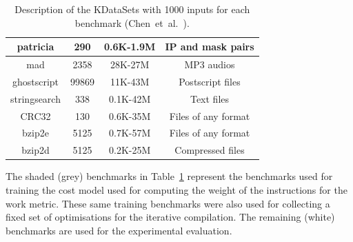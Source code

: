 \documentclass[sigplan,10pt]{acmart}
\theoremstyle{definition}
\newcommand{\etal}{et~al.}
\newcommand{\itercomp}{{iterative compilation}}
\begin{document}
\begin{table}[h]
{\begin{tabular}{|c|c|c|c|}
\rowcolor{gray!20}
patricia      & 290    & 0.6K-1.9M                  & IP and mask pairs              \\ \hline
\rowcolor{gray!20}
mad           & 2358   & 28K-27M                    & MP3 audios                     \\ \hline
\rowcolor{gray!20}
ghostscript   & 99869  & 11K-43M                    & Postscript files               \\ \hline
\rowcolor{gray!20}
stringsearch  & 338    &  0.1K-42M                 &  Text files                     \\ \hline
\rowcolor{gray!20}
CRC32         & 130    & 0.6K-35M                   & Files of any format            \\ \hline
\rowcolor{gray!20}
bzip2e        & 5125   & 0.7K-57M                   & Files of any format            \\ \hline
\rowcolor{gray!20}
bzip2d        & 5125   & 0.2K-25M                   & Compressed files               \\ \hline
\end{tabular}
}
\caption{Description of the KDataSets with 1000 inputs for each benchmark (Chen~\etal~\cite{chen10,chen12a}).}
\label{tab:kdatasets}
\end{table}

The shaded (grey) benchmarks in Table~\ref{tab:kdatasets} represent the benchmarks used for training the cost model used for computing the weight of the instructions for the work metric.
These same training benchmarks were also used for collecting a fixed set of optimisations for the {\itercomp}.
The remaining (white) benchmarks are used for the experimental evaluation.
\end{document}
